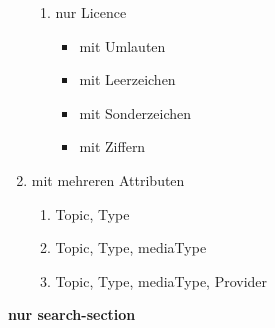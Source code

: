 \begin{enumerate}
\begin{enumerate}
        \item nur Licence
        \begin{itemize}
           \item mit Umlauten
           \item mit Leerzeichen
           \item mit Sonderzeichen
           \item mit Ziffern
        \end{itemize}
    \end{enumerate} %
    \item mit mehreren Attributen
    \begin{enumerate}
        \item Topic, Type
	     \item Topic, Type, mediaType
	     \item Topic, Type, mediaType, Provider
     \end{enumerate}
  \end{enumerate} %

\pagebreak


\flushleft \textbf{nur search-section}

